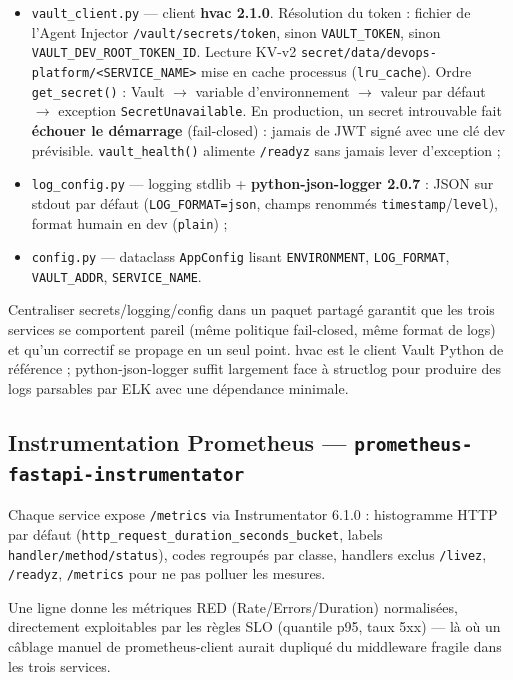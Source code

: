 \documentclass[11pt,a4paper]{article}
\begin{document}
\begin{itemize}[itemsep=2pt]
  \item \texttt{vault\_client.py} --- client \textbf{hvac 2.1.0}. Résolution du token : fichier de l'Agent Injector \texttt{/vault/secrets/token}, sinon \texttt{VAULT\_TOKEN}, sinon \texttt{VAULT\_DEV\_ROOT\_TOKEN\_ID}. Lecture KV-v2 \texttt{secret/data/devops-platform/<SERVICE\_NAME>} mise en cache processus (\texttt{lru\_cache}). Ordre \texttt{get\_secret()} : Vault $\rightarrow$ variable d'environnement $\rightarrow$ valeur par défaut $\rightarrow$ exception \texttt{SecretUnavailable}. En production, un secret introuvable fait \textbf{échouer le démarrage} (fail-closed) : jamais de JWT signé avec une clé dev prévisible. \texttt{vault\_health()} alimente \texttt{/readyz} sans jamais lever d'exception ;
  \item \texttt{log\_config.py} --- logging stdlib + \textbf{python-json-logger 2.0.7} : JSON sur stdout par défaut (\texttt{LOG\_FORMAT=json}, champs renommés \texttt{timestamp}/\texttt{level}), format humain en dev (\texttt{plain}) ;
  \item \texttt{config.py} --- dataclass \texttt{AppConfig} lisant \texttt{ENVIRONMENT}, \texttt{LOG\_FORMAT}, \texttt{VAULT\_ADDR}, \texttt{SERVICE\_NAME}.
\end{itemize}

\begin{whybox}
Centraliser secrets/logging/config dans un paquet partagé garantit que les trois services se comportent pareil (même politique fail-closed, même format de logs) et qu'un correctif se propage en un seul point. hvac est le client Vault Python de référence ; python-json-logger suffit largement face à structlog pour produire des logs parsables par ELK avec une dépendance minimale.
\end{whybox}

\subsection{Instrumentation Prometheus --- \texttt{prometheus-fastapi-instrumentator}}
Chaque service expose \texttt{/metrics} via Instrumentator 6.1.0 : histogramme HTTP par défaut (\texttt{http\_request\_duration\_seconds\_bucket}, labels \texttt{handler/method/status}), codes regroupés par classe, handlers exclus \texttt{/livez}, \texttt{/readyz}, \texttt{/metrics} pour ne pas polluer les mesures.

\begin{whybox}
Une ligne donne les métriques RED (Rate/Errors/Duration) normalisées, directement exploitables par les règles SLO (quantile p95, taux 5xx) --- là où un câblage manuel de prometheus-client aurait dupliqué du middleware fragile dans les trois services.
\end{whybox}
\end{document}

